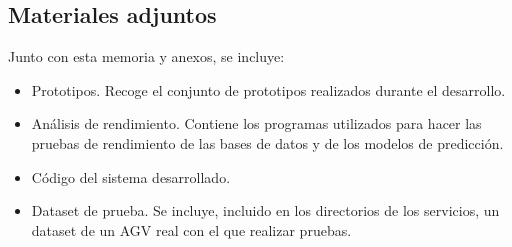 \subsection{Materiales adjuntos}

Junto con esta memoria y anexos, se incluye:
\begin{itemize}
    \item Prototipos. Recoge el conjunto de prototipos realizados durante el desarrollo.
    \item Análisis de rendimiento. Contiene los programas utilizados para hacer las pruebas de rendimiento 
        de las bases de datos y de los modelos de predicción.
    \item Código del sistema desarrollado.
    \item Dataset de prueba. Se incluye, incluido en los directorios de los servicios, un dataset de un AGV 
        real con el que realizar pruebas.
\end{itemize}